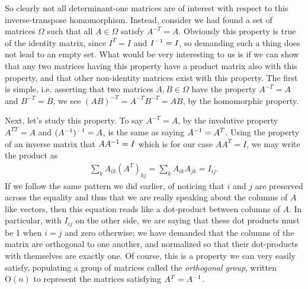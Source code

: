 \documentclass[11pt]{article}
\begin{document}
So clearly not all determinant-one matrices are of interest with respect to this inverse-transpose homomorphism. Instead, consider we had found a set of matrices $\Omega$ such that all $A \in \Omega$ satisfy $A^{-T} = A$. Obviously this property is true of the identity matrix, since $I^T = I$ and $I^{-1} = I$, so demanding such a thing does not lead to an empty set. What would be very interesting to us is if we can show that any two matrices having this property have a product matrix also with this property, and that other non-identity matrices exist with this property. The first is simple, i.e. asserting that two matrices $A,B \in \Omega$ have the property $A^{-T} = A$ and $B^{-T} = B$, we see $(AB)^{-T} = A^{-T} B^{-T} = AB$, by the homomorphic property.

Next, let's study this property. To say $A^{-T}=A$, by the involutive property $A^{TT} = A$ and $(A^{-1})^{-1}=A$, is the same as saying $A^{-1} = A^T$. Using the property of an inverse matrix that $AA^{-1} = I$ which is for our case $AA^T=I$, we may write the product as \begin{gather*}
\sum_{k} A_{ik} (A^T)_{kj} = \sum_{k} A_{ik} A_{jk}  = I_{ij}.
\end{gather*} 
If we follow the same pattern we did earlier, of noticing that $i$ and $j$ are preserved across the equality and thus that we are really speaking about the columns of $A$ like vectors, then this equation reads like a dot-product between columns of $A$. In particular, with $I_{ij}$ on the other side, we are saying that these dot products must be 1 when $i=j$ and zero otherwise; we have demanded that the columns of the matrix are orthogonal to one another, and normalized so that their dot-products with themselves are exactly one. Of course, this is a property we can very easily satisfy, populating a group of matrices called the \emph{orthogonal group}, written $\mathrm{O}(n)$ to represent the matrices satisfying $A^T=A^{-1}$.
\end{document}
